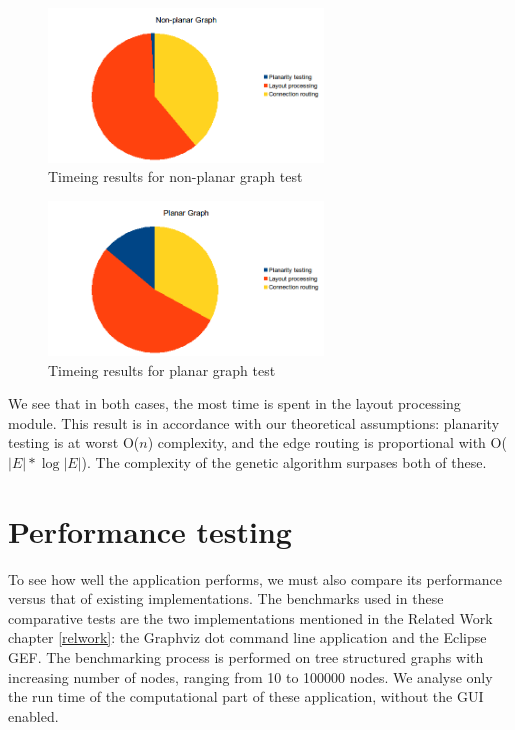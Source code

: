 \begin{figure}[ht] \centering
\includegraphics[width=0.65\textwidth]{img/results/nonplanartime.png}
\caption{Timeing results for non-planar graph test \label{pie1}} \end{figure}


\begin{figure}[ht] \centering
\includegraphics[width=0.65\textwidth]{img/results/planartime.png}
\caption{Timeing results for planar graph test \label{pie2}} \end{figure}

We see that in both cases, the most time is spent in the layout processing module. This result is in 
accordance with our theoretical assumptions: planarity testing is at worst O(${n}$) complexity, and the edge 
routing is proportional with O($|E| * \log |E|$). The complexity of the genetic algorithm surpases both of 
these.

\section{Performance testing}

To see how well the application performs, we must also compare its performance versus that of existing 
implementations. The benchmarks used in these comparative tests are the two implementations mentioned in the 
Related Work chapter \ref {relwork}: the Graphviz dot command line application and the Eclipse GEF. The benchmarking process 
is performed on tree structured graphs with increasing number of nodes, ranging from 10 to 100000 nodes. We 
analyse only the run time of the computational part of these application, without the GUI enabled.

